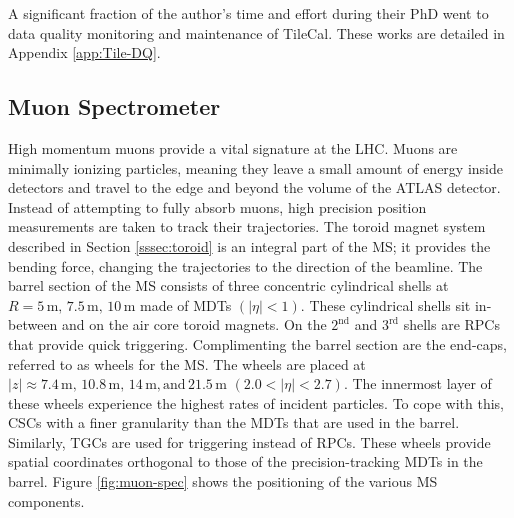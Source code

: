 			A significant fraction of the author's time and effort during their PhD went to data quality monitoring and maintenance of \gls{TileCal}. These works are detailed in Appendix \ref{app:Tile-DQ}.

	\subsection{Muon Spectrometer}\label{ssec:muon-system}
		High momentum muons provide a vital signature at the LHC. Muons are minimally ionizing particles, meaning they leave a small amount of energy inside detectors and travel to the edge and beyond the volume of the \gls{ATLAS} detector. Instead of attempting to fully absorb muons, high precision position measurements are taken to track their trajectories. The toroid magnet system described in Section \ref{sssec:toroid} is an integral part of the \gls{MS}; it provides the bending force, changing the trajectories to the direction of the beamline. The barrel section of the \gls{MS} consists of three concentric cylindrical shells at $R=5 \, \mathrm{ m, }\, 7.5 \, \mathrm{ m, } \,  10 \, \mathrm{ m}$ made of \glspl{MDT} $(|\eta|<1)$. \cite{ATLAS-muon} These cylindrical shells sit in-between and on the air core toroid magnets. On the $2^{\mathrm{nd}}$ and $3^{\mathrm{rd}}$ shells are \glspl{RPC} that provide quick triggering. Complimenting the barrel section are the end-caps, referred to as wheels for the \gls{MS}. The wheels are placed at $|z|\approx 7.4 \, \mathrm{ m, } \, 10.8 \, \mathrm{ m, } \, 14 \, \mathrm{ m, and} \,21.5 \,\mathrm{ m }$ $(2.0 < |\eta| < 2.7)$. The innermost layer of these wheels experience the highest rates of incident particles. To cope with this, \glspl{CSC} with a finer granularity than the \glspl{MDT} that are used in the barrel. Similarly, \glspl{TGC} are used for triggering instead of \glspl{RPC}. These wheels provide spatial coordinates orthogonal to those of the precision-tracking \glspl{MDT} in the barrel. Figure \ref{fig:muon-spec} shows the positioning of the various \gls{MS} components.


